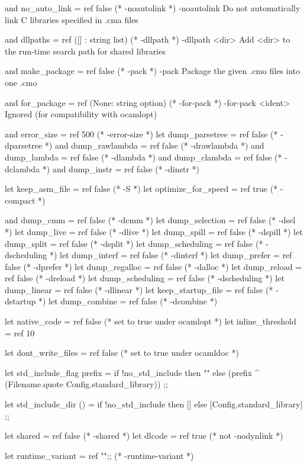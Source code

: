 \begin{bashcode}
and no_auto_link = ref false            (* -noautolink *)
-noautolink  Do not automatically link C libraries specified in .cma files

and dllpaths = ref ([] : string list)   (* -dllpath *)
-dllpath <dir>  Add <dir> to the run-time search path for shared libraries

and make_package = ref false            (* -pack *)
-pack  Package the given .cmo files into one .cmo

and for_package = ref (None: string option) (* -for-pack *)
-for-pack <ident>  Ignored (for compatibility with ocamlopt)

and error_size = ref 500                (* -error-size *)
let dump_parsetree = ref false          (* -dparsetree *)
and dump_rawlambda = ref false          (* -drawlambda *)
and dump_lambda = ref false             (* -dlambda *)
and dump_clambda = ref false            (* -dclambda *)
and dump_instr = ref false              (* -dinstr *)

let keep_asm_file = ref false           (* -S *)
let optimize_for_speed = ref true       (* -compact *)

and dump_cmm = ref false                (* -dcmm *)
let dump_selection = ref false          (* -dsel *)
let dump_live = ref false               (* -dlive *)
let dump_spill = ref false              (* -dspill *)
let dump_split = ref false              (* -dsplit *)
let dump_scheduling = ref false         (* -dscheduling *)
let dump_interf = ref false             (* -dinterf *)
let dump_prefer = ref false             (* -dprefer *)
let dump_regalloc = ref false           (* -dalloc *)
let dump_reload = ref false             (* -dreload *)
let dump_scheduling = ref false         (* -dscheduling *)
let dump_linear = ref false             (* -dlinear *)
let keep_startup_file = ref false       (* -dstartup *)
let dump_combine = ref false            (* -dcombine *)

let native_code = ref false             (* set to true under ocamlopt *)
let inline_threshold = ref 10

let dont_write_files = ref false        (* set to true under ocamldoc *)

let std_include_flag prefix =
  if !no_std_include then ""
  else (prefix ^ (Filename.quote Config.standard_library))
;;

let std_include_dir () =
  if !no_std_include then [] else [Config.standard_library]
;;

let shared = ref false (* -shared *)
let dlcode = ref true (* not -nodynlink *)

let runtime_variant = ref "";;     (* -runtime-variant *)
\end{bashcode}


